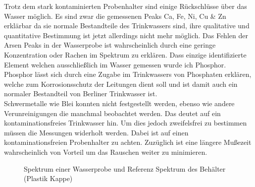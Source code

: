 Trotz dem stark kontaminierten Probenhalter sind einige Rückschlüsse über das Wasser möglich. Es sind zwar die gemessenen Peaks Ca, Fe, Ni, Cu & Zn erklärbar da sie normale Bestandteile des Trinkwassers sind, ihre qualitative und quantitative Bestimmung ist jetzt allerdings nicht mehr möglich. Das Fehlen der Arsen Peaks in der Wasserprobe ist wahrscheinlich durch eine geringe Konzentration oder Rachen im Spektrum zu erklären. Dass einzige identifizierte Element welchen ausschließlich im Wasser gemessen wurde ich Phosphor. Phosphor lässt sich durch eine Zugabe im Trinkwassers von Phosphaten erklären, welche zum Korrosionsschutz der Leitungen dient soll und ist damit auch ein normaler Bestandteil von Berliner Trinkwasser ist.\\
Schwermetalle wie Blei konnten nicht festgestellt werden, ebenso wie andere Verunreinigungen die manchmal beobachtet werden. Das deutet auf ein kontaminationsfreies Trinkwasser hin. Um dies jedoch zweifelsfrei zu bestimmen müssen die Messungen widerholt werden. Dabei ist auf einen kontaminationsfreien Probenhalter zu achten. Zuzüglich ist eine längere Mußezeit wahrscheinlich von Vorteil um das Rauschen weiter zu minimieren.



\begin{figure}%
    \centering
    \qquad
    \caption{Spektrum einer Wasserprobe und Referenz Spektrum des Behälter (Plastik Kappe)}%
    \label{fig:example}%
\end{figure}
